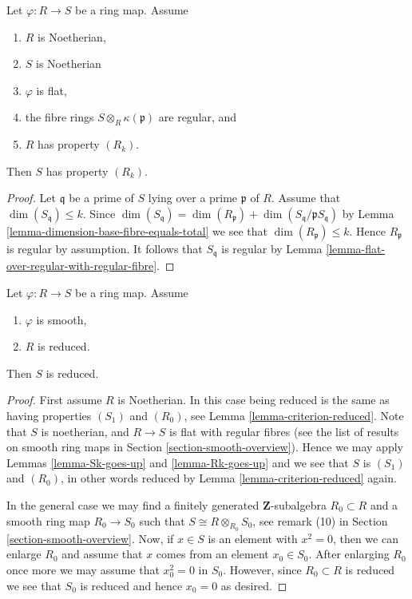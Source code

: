 \begin{lemma}
\label{lemma-Rk-goes-up}
Let $\varphi : R \to S$ be a ring map. Assume
\begin{enumerate}
\item $R$ is Noetherian,
\item $S$ is Noetherian
\item $\varphi$ is flat,
\item the fibre rings $S \otimes_R \kappa(\mathfrak p)$ are regular, and
\item $R$ has property $(R_k)$.
\end{enumerate}
Then $S$ has property $(R_k)$.
\end{lemma}

\begin{proof}
Let $\mathfrak q$ be a prime of $S$
lying over a prime $\mathfrak p$ of $R$.
Assume that $\dim(S_{\mathfrak q}) \leq k$.
Since $\dim(S_{\mathfrak q}) = \dim(R_{\mathfrak p})
+ \dim(S_{\mathfrak q}/\mathfrak pS_{\mathfrak q})$ by
Lemma \ref{lemma-dimension-base-fibre-equals-total}
we see that $\dim(R_{\mathfrak p}) \leq k$.
Hence $R_{\mathfrak p}$ is regular by assumption.
It follows that $S_{\mathfrak q}$ is regular by
Lemma \ref{lemma-flat-over-regular-with-regular-fibre}.
\end{proof}

\begin{lemma}
\label{lemma-reduced-goes-up}
Let $\varphi : R \to S$ be a ring map. Assume
\begin{enumerate}
\item $\varphi$ is smooth,
\item $R$ is reduced.
\end{enumerate}
Then $S$ is reduced.
\end{lemma}

\begin{proof}
First assume $R$ is Noetherian.
In this case being reduced is the same as having properties
$(S_1)$ and $(R_0)$, see Lemma \ref{lemma-criterion-reduced}.
Note that $S$ is noetherian, and
$R \to S$ is flat with regular fibres (see the list of
results on smooth ring maps in Section \ref{section-smooth-overview}).
Hence we may apply Lemmas \ref{lemma-Sk-goes-up} and \ref{lemma-Rk-goes-up}
and we see that $S$ is $(S_1)$ and $(R_0)$, in other words reduced
by Lemma \ref{lemma-criterion-reduced} again.

\medskip\noindent
In the general case we may find a finitely generated
$\mathbf{Z}$-subalgebra $R_0 \subset R$ and a smooth ring
map $R_0 \to S_0$ such that $S \cong R \otimes_{R_0} S_0$, see
remark (10) in Section \ref{section-smooth-overview}.
Now, if $x \in S$ is an element with $x^2 = 0$,
then we can enlarge $R_0$ and assume that $x$ comes
from an element $x_0 \in S_0$. After enlarging
$R_0$ once more we may assume that $x_0^2 = 0$ in $S_0$.
However, since $R_0 \subset R$ is reduced we see that
$S_0$ is reduced and hence $x_0 = 0$ as desired.
\end{proof}

